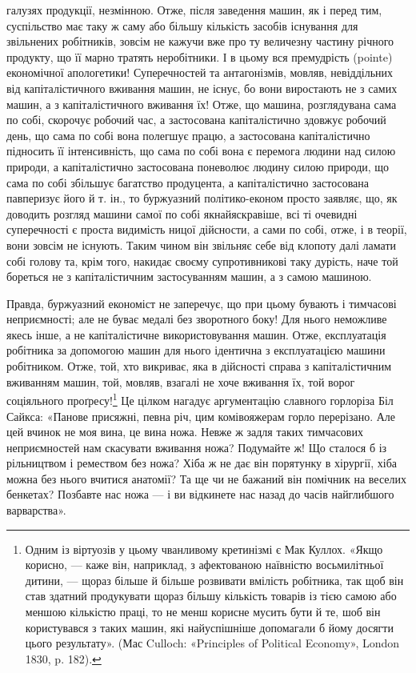 галузях продукції, незмінною. Отже, після заведення машин,
як і перед тим, суспільство має таку ж саму або більшу кількість
засобів існування для звільнених робітників, зовсім не кажучи
вже про ту величезну частину річного продукту, що її марно
тратять неробітники. І в цьому вся премудрість (pointe) економічної
апологетики! Суперечностей та антагонізмів, мовляв, невіддільних
від капіталістичного вживання машин, не існує, бо
вони виростають не з самих машин, а з капіталістичного вживання
їх! Отже, що машина, розглядувана сама по собі, скорочує
робочий час, а застосована капіталістично здовжує робочий день,
що сама по собі вона полегшує працю, а застосована капіталістично
підносить її інтенсивність, що сама по собі вона є перемога
людини над силою природи, а капіталістично застосована
поневолює людину силою природи, що сама по собі збільшує багатство
продуцента, а капіталістично застосована павперизує
його й т. ін., то буржуазний політико-економ просто заявляє,
що, як доводить розгляд машини самої по собі якнайяскравіше,
всі ті очевидні суперечності є проста видимість ницої дійсности,
а сами по собі, отже, і в теорії, вони зовсім не існують. Таким чином
він звільняє себе від клопоту далі ламати собі голову та,
крім того, накидає своєму супротивникові таку дурість, наче той
бореться не з капіталістичним застосуванням машин, а з самою
машиною.

Правда, буржуазний економіст не заперечує, що при цьому
бувають і тимчасові неприємності; але не буває медалі без зворотного
боку! Для нього неможливе якесь інше, а не капіталістичне
використовування машин. Отже, експлуатація робітника за допомогою
машин для нього ідентична з експлуатацією машини робітником.
Отже, той, хто викриває, яка в дійсності справа з капіталістичним
вживанням машин, той, мовляв, взагалі не хоче вживання
їх, той ворог соціяльного проґресу!\footnote{
Одним із віртуозів у цьому чванливому кретинізмі є Мак Куллох.
«Якщо корисно, — каже він, наприклад, з афектованою наївністю
восьмилітньої дитини, — щораз більше й більше розвивати вмілість робітника,
так щоб він став здатний продукувати щораз більшу кількість товарів
із тією самою або меншою кількістю праці, то не менш корисне мусить
бути й те, шоб він користувався з таких машин, які найуспішніше допомагали
б йому досягти цього результату». (Мас Culloch: «Principles
of Political Economy», London 1830, p. 182).
} Це цілком нагадує
аргументацію славного горлоріза Біл Сайкса: «Панове присяжні,
певна річ, цим комівояжерам горло перерізано. Але цей вчинок
не моя вина, це вина ножа. Невже ж задля таких тимчасових
неприємностей нам скасувати вживання ножа? Подумайте ж!
Що сталося б із рільництвом і ремеством без ножа? Хіба ж не
дає він порятунку в хірургії, хіба можна без нього вчитися анатомії?
Та ще чи не бажаний він помічник на веселих бенкетах?
Позбавте нас ножа — і ви відкинете нас назад до часів найглибшого
варварства».